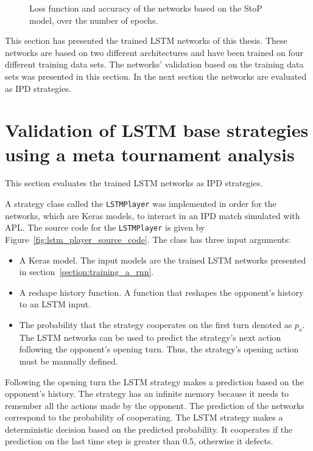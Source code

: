 \begin{figure}[!htbp]
\begin{subfigure}{\textwidth}
    \end{subfigure}
    \caption{Loss function and accuracy of the networks based on the StoP
    model, over the number of epochs.}\label{fig:validation_sequence_to_probability}
\end{figure}

This section has presented the \lstmnetworks trained LSTM networks of this thesis.
These networks are based on two different architectures and have been trained
on four different training data sets. The networks' validation based on the
training data sets was presented in this section. In the next section the networks
are evaluated as IPD strategies.

\section{Validation of LSTM base strategies using a meta tournament analysis}\label{section:rnn_strategy_validation}

This section evaluates the trained LSTM networks as IPD strategies.

A strategy class called the \texttt{LSTMPlayer} was implemented
in order for the networks, which are Keras models, to interact in an IPD match
simulated with APL. The source code for the \texttt{LSTMPlayer} is
given by Figure~\ref{fig:lstm_player_source_code}. The class has three input
arguments:

\begin{itemize}
    \item A Keras model. The input models are the \lstmnetworks trained LSTM networks
    presented in section~\ref{section:training_a_rnn}.
    \item A reshape history function. A function that reshapes the opponent's
    history to an LSTM input.
    \item The probability that the strategy cooperates on the first turn denoted
    as \(p_o\). The LSTM networks can be used to predict the strategy's next
    action following the opponent's opening turn. Thus, the strategy's opening
    action must be manually defined.
\end{itemize}

Following the opening turn the LSTM strategy makes a prediction based on the
opponent's history. The strategy has an infinite memory because it needs to
remember all the actions made by the opponent. The prediction of the networks
correspond to the probability of cooperating. The LSTM strategy makes a deterministic
decision based on the predicted probability. It cooperates if the prediction
on the last time step is greater than 0.5, otherwise it defects.

